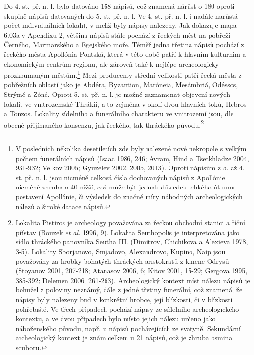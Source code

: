 Do 4. st. př. n. l. bylo datováno 168 nápisů, což znamená nárůst o 180  oproti skupině nápisů datovaných do 5. st. př. n. l. Ve 4. st. př. n. l. i nadále narůstá počet individuálních lokalit, v nichž byly nápisy nalezeny. Jak dokazuje mapa 6.03a v Apendixu 2, většina nápisů stále pochází z řeckých měst na pobřeží Černého, Marmarského a Egejského moře. Téměř jedna třetina nápisů pochází z řeckého města Apollónia Pontská, která v této době patří k hlavním kulturním a ekonomickým centrům regionu, ale zároveň také k nejlépe archeologicky prozkoumaným městům.\footnote{V posledních několika desetiletích zde byly nalezené nové nekropole s velkým počtem funerálních nápisů (Isaac 1986, 246; Avram, Hind a Tsetkhladze 2004, 931-932; Velkov 2005; Gyuzelev 2002, 2005, 2013). Oproti nápisům z 5. až 4. st. př. n. l. jsou nicméně celková čísla dochovaných nápisů z Apollónie nicméně zhruba o 40  nižší, což může být jednak důsledek lehkého útlumu postavení Apollónie, či výsledek do značné míry náhodných archeologických nálezů a široké datace nápisů.} Mezi producenty střední velikosti patří řecká města z pobřežních oblastí jako je Abdéra, Byzantion, Maróneia, Mesámbriá, Odéssos, Strýmé a Zóné. Oproti 5. st. př. n. l. je možné zaznamenat objevení nových lokalit ve vnitrozemské Thrákii, a to zejména v okolí dvou hlavních toků, Hebros a Tonzos. Lokality sídelního a funerálního charakteru ve vnitrozemí jsou, dle obecně přijímaného konsenzu, jak řeckého, tak thráckého původu.\footnote{Lokalita Pistiros je archeology považována za řeckou obchodní stanici a říční přístav (Bouzek {\em et al.} 1996, 9). Lokalita Seuthopolis je interpretována jako sídlo thráckého panovníka Seutha III. (Dimitrov, Chichikova a Alexieva 1978, 3-5). Lokality Sborjanovo, Smjadovo, Alexandrovo, Kupino, Naip jsou považovány za hrobky bohatých thráckých aristokratů z kmene Odrysů (Stoyanov 2001, 207-218; Atanasov 2006, 6; Kitov 2001, 15-29; Gergova 1995, 385-392; Delemen 2006, 261-263). Archeologický kontext míst nálezu nápisů je bohužel z poloviny neznámý, dále z jedné třetiny funerální, což znamená, že nápisy byly nalezeny buď v konkrétní hrobce, její blízkosti, či v blízkosti pohřebiště. Ve třech případech pochází nápisy ze sídelního archeologického kontextu, a ve dvou případech bylo místo jejich nálezu určeno jako náboženského původu, např. u nápisů pocházejících ze svatyně. Sekundární archeologický kontext je znám celkem u 21 nápisů, což je zhruba osmina souboru.}

